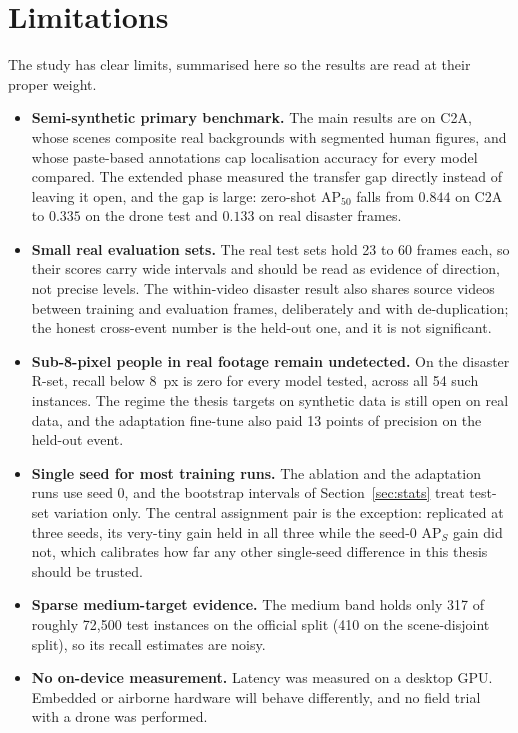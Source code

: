 \section{Limitations}
The study has clear limits, summarised here so the results are read at their
proper weight.
\begin{itemize}
  \item \textbf{Semi-synthetic primary benchmark.} The main results are on
        C2A, whose scenes composite real backgrounds with segmented human
        figures, and whose paste-based annotations cap localisation accuracy
        for every model compared. The extended phase measured the transfer
        gap directly instead of leaving it open, and the gap is large:
        zero-shot $\mathrm{AP}_{50}$ falls from $0.844$ on C2A to $0.335$ on
        the drone test and $0.133$ on real disaster frames.
  \item \textbf{Small real evaluation sets.} The real test sets hold 23 to
        60 frames each, so their scores carry wide intervals and should be
        read as evidence of direction, not precise levels. The within-video
        disaster result also shares source videos between training and
        evaluation frames, deliberately and with de-duplication; the honest
        cross-event number is the held-out one, and it is not significant.
  \item \textbf{Sub-8-pixel people in real footage remain undetected.} On
        the disaster R-set, recall below 8~px is zero for every model
        tested, across all 54 such instances. The regime the thesis targets
        on synthetic data is still open on real data, and the adaptation
        fine-tune also paid 13 points of precision on the held-out event.
  \item \textbf{Single seed for most training runs.} The ablation and the
        adaptation runs use seed 0, and the bootstrap intervals of
        Section~\ref{sec:stats} treat test-set variation only. The central
        assignment pair is the exception: replicated at three seeds, its
        very-tiny gain held in all three while the seed-0 $\mathrm{AP}_S$
        gain did not, which calibrates how far any other single-seed
        difference in this thesis should be trusted.
  \item \textbf{Sparse medium-target evidence.} The medium band holds only
        317 of roughly 72{,}500 test instances on the official split (410 on
        the scene-disjoint split), so its recall estimates are noisy.
  \item \textbf{No on-device measurement.} Latency was measured on a desktop
        GPU. Embedded or airborne hardware will behave differently, and no
        field trial with a drone was performed.
\end{itemize}

